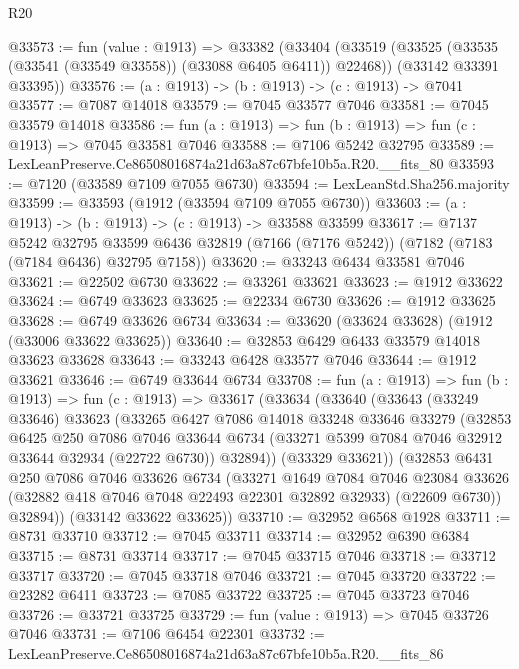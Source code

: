 \begin{lexlean}{R20}
\begin{coremodule}
{@33573 := fun (value : @1913) =>
  @33382
    (@33404
      (@33519 (@33525 (@33535 (@33541 (@33549 @33558)) (@33088 @6405 @6411)) @22468))
      (@33142 @33391 @33395))
@33576 := (a : @1913) -> (b : @1913) -> (c : @1913) -> @7041
@33577 := @7087 @14018
@33579 := @7045 @33577 @7046
@33581 := @7045 @33579 @14018
@33586 := fun (a : @1913) => fun (b : @1913) => fun (c : @1913) => @7045 @33581 @7046
@33588 := @7106 @5242 @32795
@33589 := LexLeanPreserve.Ce86508016874a21d63a87c67bfe10b5a.R20.__fits_80
@33593 := @7120 (@33589 @7109 @7055 @6730)
@33594 := LexLeanStd.Sha256.majority
@33599 := @33593 (@1912 (@33594 @7109 @7055 @6730))
@33603 := (a : @1913) -> (b : @1913) -> (c : @1913) -> @33588 @33599
@33617 := @7137
    @5242
    @32795
    @33599
    @6436
    @32819
    (@7166 (@7176 @5242))
    (@7182 (@7183 (@7184 @6436) @32795 @7158))
@33620 := @33243 @6434 @33581 @7046
@33621 := @22502 @6730
@33622 := @33261 @33621
@33623 := @1912 @33622
@33624 := @6749 @33623
@33625 := @22334 @6730
@33626 := @1912 @33625
@33628 := @6749 @33626 @6734
@33634 := @33620 (@33624 @33628) (@1912 (@33006 @33622 @33625))
@33640 := @32853 @6429 @6433 @33579 @14018 @33623 @33628
@33643 := @33243 @6428 @33577 @7046
@33644 := @1912 @33621
@33646 := @6749 @33644 @6734
@33708 := fun (a : @1913) =>
  fun (b : @1913) =>
  fun (c : @1913) =>
  @33617
    (@33634
      (@33640
        (@33643
          (@33249 @33646)
          @33623
          (@33265
            @6427
            @7086
            @14018
            @33248
            @33646
            @33279
            (@32853
              @6425
              @250
              @7086
              @7046
              @33644
              @6734
              (@33271 @5399 @7084 @7046 @32912 @33644 @32934 (@22722 @6730))
              @32894))
          (@33329 @33621))
        (@32853
          @6431
          @250
          @7086
          @7046
          @33626
          @6734
          (@33271
            @1649
            @7084
            @7046
            @23084
            @33626
            (@32882 @418 @7046 @7048 @22493 @22301 @32892 @32933)
            (@22609 @6730))
          @32894))
      (@33142 @33622 @33625))
@33710 := @32952 @6568 @1928
@33711 := @8731 @33710
@33712 := @7045 @33711
@33714 := @32952 @6390 @6384
@33715 := @8731 @33714
@33717 := @7045 @33715 @7046
@33718 := @33712 @33717
@33720 := @7045 @33718 @7046
@33721 := @7045 @33720
@33722 := @23282 @6411
@33723 := @7085 @33722
@33725 := @7045 @33723 @7046
@33726 := @33721 @33725
@33729 := fun (value : @1913) => @7045 @33726 @7046
@33731 := @7106 @6454 @22301
@33732 := LexLeanPreserve.Ce86508016874a21d63a87c67bfe10b5a.R20.__fits_86
}
\end{coremodule}
\end{lexlean}
